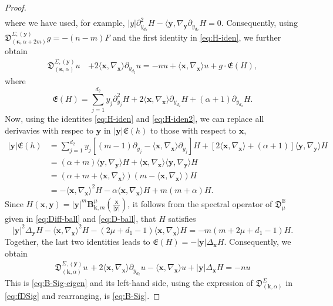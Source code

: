 \documentclass{amsart}
\theoremstyle{remark}
\def\la{{\langle}}
\def\ra{{\rangle}}
\def\fD{{\mathfrak D}}
\def\fE{{\mathfrak E}}
\def\a{{\alpha}}
\def\la{{\langle}}
\def\ra{{\rangle}}
\def\kb{{\bm k}}
\def\xb{{\bm x}}
\def\yb{{\bm y}}
\def\BB{{\mathbb B}}
\def\bg{{\boldsymbol{\gamma}}}
\def\bk{{\boldsymbol{\kappa}}}
\begin{document}
\begin{proof}
\begin{align*}
\end{align*}
where we have used, for example, $|y| \partial_{y_{d_2}}^2 H - \la \yb, \nabla_{\yb} \partial_{y_{d_2}} H = 0$. Consequently,
using $\fD_{(\bk,\alpha+2m)}^{\Sigma, (\yb)} g = -(n-m) F$ and the first identity in \eqref{eq:H-iden}, we further obtain
\begin{align} \label{eq:D+EH}
  \fD_{(\bk, \alpha)}^{\Sigma, (\yb)} u  \, & + 2 \la \xb,\nabla_\xb\ra \partial_{y_{d_2}} u = 
   -n u + \la \xb,\nabla_{\xb} \ra u + g \cdot \fE(H), 
\end{align}
where 
$$
  \fE(H) = \sum_{j=1}^{d_2} y_j \partial_{y_j}^2 H + 2 \la \xb, \nabla_\xb \ra \partial_{y_{d_2}} H + (\a +1) \partial_{y_{d_2}} H.
$$
Now, using the identites \eqref{eq:H-iden} and \eqref{eq:H-iden2}, we can replace all derivavies with
respec to $\yb$ in $|\yb| \fE(h)$ to those with respect to $\xb$, 
\begin{align*}
|\yb| \fE(h) & =  \sum_{j=1}^{d_2} y_j \left[(m-1) \partial_{y_j} - \la \xb, \nabla_{\xb} \ra \partial_{y_j} \right] H 
  + [2 \la \xb, \nabla_\xb\ra  + (\a +1) ] \la \yb, \nabla_{\yb} \ra H \\
& = (\a + m) \la \yb, \nabla_\yb\ra H  +  \la \xb, \nabla_{\xb} \ra  \la \yb, \nabla_{\yb} \ra H \\  
& = \left( \a + m + \la \xb, \nabla_{\xb}\ra  \right) (m- \la \xb, \nabla_{\xb} \ra)H   \\
& =  - \la \xb,\nabla_\xb\ra^2 H -  \a \la \xb,\nabla_\xb\ra H + m (m+ \a) H.
\end{align*}
Since $H(\xb,\yb) = |\yb|^m \bm B_{\bm k, m}^\mu \left(\frac{\bm x}{|\bm y|}\right)$, it follows from the spectral operator
of $\fD_\mu^\BB$ given in \eqref{eq:Diff-ball} and \eqref{eq:D-ball}, that $H$ satisfies 
$$
    |\yb|^2 \Delta_{\yb} H - \la \xb, \nabla_{\xb} \ra^2 H - (2\mu + d_1-1) \la \xb, \nabla_{\xb} \ra H = - m(m+2\mu + d_1 -1) H.
$$
Together, the last two identities leads to $\fE(H) = - |\yb| \Delta_{\xb} H$. Consequently, we obtain
\begin{align*}
  \fD_{(\kb, \alpha)}^{\Sigma, (\yb)} u  \,  + 2 \la \xb,\nabla_\xb\ra \partial_{y_{d_2}} u - \la \xb,\nabla_{\xb} \ra u + |\yb| \Delta_{\xb} H
  =  -n u  
\end{align*}
This is \eqref{eq:B-Sig-eigen} and its left-hand side, using the expression of $\fD_{(\kb, \alpha)}^\Sigma$ in \eqref{eq:fDSig}
and rearranging, is \eqref{eq:B-Sig}. 
\end{proof}
 
\end{document}
